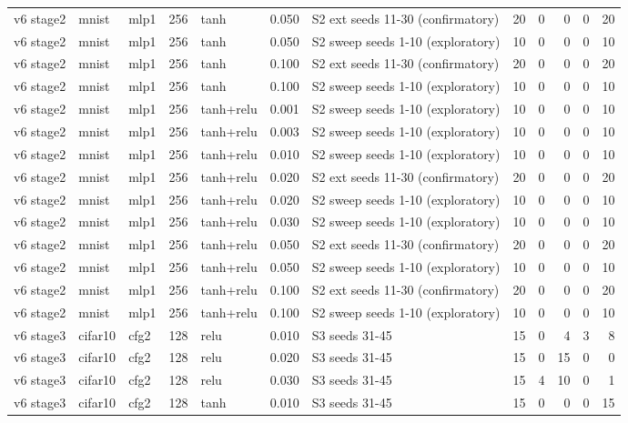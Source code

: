 \begin{table}[htbp]
{\begin{tabular}{@{}lllrlrlrrrrr@{}}
v6 stage2 & mnist & mlp1 & 256 & tanh & 0.050 & S2 ext seeds 11-30 (confirmatory) & 20 & 0 & 0 & 0 & 20 \\
v6 stage2 & mnist & mlp1 & 256 & tanh & 0.050 & S2 sweep seeds 1-10 (exploratory) & 10 & 0 & 0 & 0 & 10 \\
v6 stage2 & mnist & mlp1 & 256 & tanh & 0.100 & S2 ext seeds 11-30 (confirmatory) & 20 & 0 & 0 & 0 & 20 \\
v6 stage2 & mnist & mlp1 & 256 & tanh & 0.100 & S2 sweep seeds 1-10 (exploratory) & 10 & 0 & 0 & 0 & 10 \\
v6 stage2 & mnist & mlp1 & 256 & tanh+relu & 0.001 & S2 sweep seeds 1-10 (exploratory) & 10 & 0 & 0 & 0 & 10 \\
v6 stage2 & mnist & mlp1 & 256 & tanh+relu & 0.003 & S2 sweep seeds 1-10 (exploratory) & 10 & 0 & 0 & 0 & 10 \\
v6 stage2 & mnist & mlp1 & 256 & tanh+relu & 0.010 & S2 sweep seeds 1-10 (exploratory) & 10 & 0 & 0 & 0 & 10 \\
v6 stage2 & mnist & mlp1 & 256 & tanh+relu & 0.020 & S2 ext seeds 11-30 (confirmatory) & 20 & 0 & 0 & 0 & 20 \\
v6 stage2 & mnist & mlp1 & 256 & tanh+relu & 0.020 & S2 sweep seeds 1-10 (exploratory) & 10 & 0 & 0 & 0 & 10 \\
v6 stage2 & mnist & mlp1 & 256 & tanh+relu & 0.030 & S2 sweep seeds 1-10 (exploratory) & 10 & 0 & 0 & 0 & 10 \\
v6 stage2 & mnist & mlp1 & 256 & tanh+relu & 0.050 & S2 ext seeds 11-30 (confirmatory) & 20 & 0 & 0 & 0 & 20 \\
v6 stage2 & mnist & mlp1 & 256 & tanh+relu & 0.050 & S2 sweep seeds 1-10 (exploratory) & 10 & 0 & 0 & 0 & 10 \\
v6 stage2 & mnist & mlp1 & 256 & tanh+relu & 0.100 & S2 ext seeds 11-30 (confirmatory) & 20 & 0 & 0 & 0 & 20 \\
v6 stage2 & mnist & mlp1 & 256 & tanh+relu & 0.100 & S2 sweep seeds 1-10 (exploratory) & 10 & 0 & 0 & 0 & 10 \\
v6 stage3 & cifar10 & cfg2 & 128 & relu & 0.010 & S3 seeds 31-45 & 15 & 0 & 4 & 3 & 8 \\
v6 stage3 & cifar10 & cfg2 & 128 & relu & 0.020 & S3 seeds 31-45 & 15 & 0 & 15 & 0 & 0 \\
v6 stage3 & cifar10 & cfg2 & 128 & relu & 0.030 & S3 seeds 31-45 & 15 & 4 & 10 & 0 & 1 \\
v6 stage3 & cifar10 & cfg2 & 128 & tanh & 0.010 & S3 seeds 31-45 & 15 & 0 & 0 & 0 & 15 \\

\end{tabular}}
\end{table}
